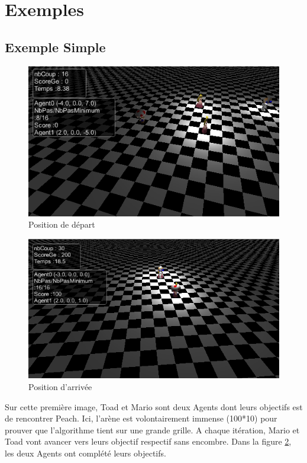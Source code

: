 \documentclass[11pt]{article}
\begin{document}
  
  \section{Exemples}
  
  \subsection{Exemple Simple}
  
   \begin{figure}[H]
      \centering
      \includegraphics[scale=0.7]{Image/grandTableau.png} 
      \caption{Position de départ}
      \label{fig:grandTableau}
  \end{figure}
  
  \begin{figure}[H]
      \centering
      \includegraphics[scale=0.7]{Image/grandTableauSolution.png} 
      \caption{Position d'arrivée}
      \label{fig:grandTableauSolution}
  \end{figure}
  Sur cette première image, Toad et Mario sont deux Agents dont leurs objectifs est de rencontrer Peach.
  Ici, l'arène est volontairement immense (100*10) pour prouver que l'algorithme tient sur une grande grille.
  A chaque itération, Mario et Toad vont avancer vers leurs objectif respectif sans encombre.
  Dans la figure \ref{fig:grandTableauSolution}, les deux Agents ont complété leurs objectifs. 
  
\end{document}
